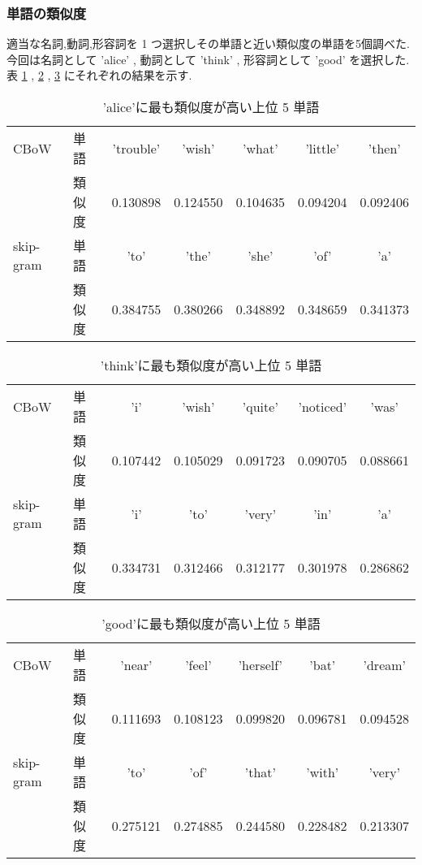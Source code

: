 \documentclass{jarticle}     %
\begin{document}
\subsubsection{単語の類似度}
適当な名詞,動詞,形容詞を 1 つ選択しその単語と近い類似度の単語を5個調べた.
今回は名詞として 'alice' , 動詞として 'think' , 形容詞として 'good' を選択した.表 \ref{alice} , \ref{think} , \ref{good} にそれぞれの結果を示す.

\begin{table}[H]
  \caption{'alice'に最も類似度が高い上位 5 単語}
  \label{alice}
  \centering
  \begin{tabular}{llccccc}
    \hline
    CBoW & 単語       & 'trouble'  & 'wish'     & 'what'     & 'little'   & 'then'     \\
     & 類似度 & 0.130898 & 0.124550 & 0.104635 & 0.094204 & 0.092406 \\
     \hline
    skip-gram & 単語       & 'to'  & 'the'     & 'she'     & 'of'   & 'a' \\
    & 類似度 & 0.384755 & 0.380266 & 0.348892 & 0.348659 & 0.341373 \\
    \hline
  \end{tabular}
\end{table}

\begin{table}[H]
  \caption{'think'に最も類似度が高い上位 5 単語}
  \label{think}
  \centering
  \begin{tabular}{llccccc}
    \hline
    CBoW & 単語       & 'i'  & 'wish'     & 'quite'     & 'noticed'   & 'was'     \\
    & 類似度 &  0.107442 & 0.105029 & 0.091723 & 0.090705 & 0.088661 \\
    \hline
    skip-gram & 単語       & 'i'  & 'to'     & 'very'     & 'in'   & 'a'     \\
    & 類似度 &  0.334731 & 0.312466 & 0.312177 & 0.301978 & 0.286862 \\
    \hline
  \end{tabular}
\end{table}


\begin{table}[H]
  \caption{'good'に最も類似度が高い上位 5 単語}
  \label{good}
  \centering
  \begin{tabular}{llccccc}
    \hline
    CBoW & 単語       & 'near'  & 'feel'     & 'herself'     & 'bat'   & 'dream'     \\
     & 類似度 &  0.111693 & 0.108123 & 0.099820 & 0.096781 & 0.094528 \\
    \hline
    skip-gram & 単語       & 'to'  & 'of'     & 'that'     & 'with'   & 'very'     \\
     & 類似度 &  0.275121 & 0.274885 & 0.244580 & 0.228482 & 0.213307 \\
    \hline
  \end{tabular}
\end{table}
\end{document}
